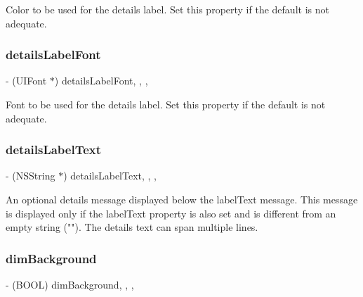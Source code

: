 Color to be used for the details label. Set this property if the default is not adequate. \mbox{\label{interface_m_b_progress_h_u_d_af3a772e02286bf867c2b4c2213be0180}} 
\subsubsection{\texorpdfstring{details\+Label\+Font}{detailsLabelFont}}
{\footnotesize\ttfamily -\/ (U\+I\+Font $\ast$) details\+Label\+Font\hspace{0.3cm}{\ttfamily [read]}, {\ttfamily [write]}, {\ttfamily [atomic]}, {\ttfamily [assign]}}

Font to be used for the details label. Set this property if the default is not adequate. \mbox{\label{interface_m_b_progress_h_u_d_ab5ad528a731e513b39e3183129af1f37}} 
\subsubsection{\texorpdfstring{details\+Label\+Text}{detailsLabelText}}
{\footnotesize\ttfamily -\/ (N\+S\+String $\ast$) details\+Label\+Text\hspace{0.3cm}{\ttfamily [read]}, {\ttfamily [write]}, {\ttfamily [atomic]}, {\ttfamily [copy]}}

An optional details message displayed below the label\+Text message. This message is displayed only if the label\+Text property is also set and is different from an empty string (""). The details text can span multiple lines. \mbox{\label{interface_m_b_progress_h_u_d_ab781ccd4428c8eff6907d2cdc90fc3ee}} 
\subsubsection{\texorpdfstring{dim\+Background}{dimBackground}}
{\footnotesize\ttfamily -\/ (B\+O\+OL) dim\+Background\hspace{0.3cm}{\ttfamily [read]}, {\ttfamily [write]}, {\ttfamily [atomic]}, {\ttfamily [assign]}}

